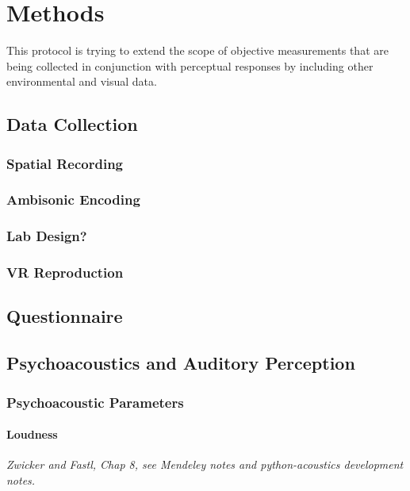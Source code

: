 \chapter{Methods}
\label{ch:methods}

This protocol is trying to extend the scope of objective measurements that are being collected in conjunction with perceptual responses by including other environmental and visual data.

\section{Data Collection}

  \subsection{Spatial Recording}

  \subsection{Ambisonic Encoding}

  \subsection{Lab Design?}

  \subsection{VR Reproduction}

\section{Questionnaire}

\section{Psychoacoustics and Auditory Perception}

  \subsection{Psychoacoustic Parameters}

  \subsubsection{Loudness}
    \emph{Zwicker and Fastl, Chap 8, see Mendeley notes and python-acoustics development notes.}
